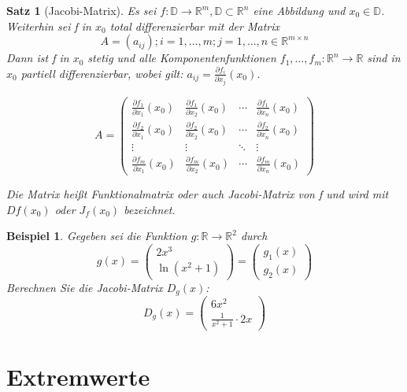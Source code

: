 \documentclass[12pt,a4paper]{scrreprt}
\newtheorem{beispiel}[defi]{Beispiel}
\newtheorem{satz}[defi]{Satz}
\begin{document}
\begin{satz}[Jacobi-Matrix]
	Es sei $f:\mathbb{D}\to \mathbb{R}^m,\mathbb{D}\subset\mathbb{R}^n$ eine Abbildung und $x_0\in\mathbb{D}$. Weiterhin sei f in $x_0$ total differenzierbar mit der Matrix
	\[A=(a_{ij});i=1,\dots,m;j=1,\dots,n \in\mathbb{R}^{m\times n}\]
	Dann ist f in $x_0$ stetig und alle Komponentenfunktionen $f_1,\dots,f_m:\mathbb{R}^n\to\mathbb{R}$ sind in $x_0$ partiell differenzierbar, wobei gilt: $a_{ij}=\frac{\partial f_i}{\partial x_j}(x_0)$.
	
	\[A=\begin{pmatrix}
	\frac{\partial f_1}{\partial x_1}(x_0) & \frac{\partial f_1}{\partial x_2}(x_0) & \cdots & \frac{\partial f_1}{\partial x_n}(x_0) \\
	\frac{\partial f_2}{\partial x_1}(x_0) & \frac{\partial f_2}{\partial x_2}(x_0) & \cdots & \frac{\partial f_2}{\partial x_n}(x_0) \\
	\vdots & \vdots & \ddots & \vdots \\
	\frac{\partial f_m}{\partial x_1}(x_0) & \frac{\partial f_m}{\partial x_2}(x_0) & \cdots & \frac{\partial f_m}{\partial x_n}(x_0)
	\end{pmatrix}\]
	
	Die Matrix heißt Funktionalmatrix oder auch Jacobi-Matrix von f und wird mit $Df(x_0)$ oder $J_f(x_0)$ bezeichnet.
\end{satz}

\begin{beispiel}
	Gegeben sei die Funktion $g:\mathbb{R}\to\mathbb{R}^2$ durch \[g(x)=\begin{pmatrix}2x^3 \\ \ln(x^2+1)
	\end{pmatrix} = \begin{pmatrix}
	g_1(x) \\ g_2(x)
	\end{pmatrix}\]
	Berechnen Sie die Jacobi-Matrix $D_g(x)$:
	\[D_g(x)=\begin{pmatrix}6x^2 \\ \frac{1}{x^2+1}\cdot2x\end{pmatrix}\]
\end{beispiel}

\section{Extremwerte}
\end{document}
